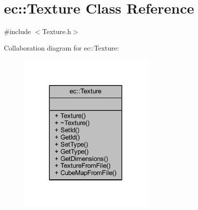 \hypertarget{classec_1_1_texture}{}\section{ec\+:\+:Texture Class Reference}
\label{classec_1_1_texture}


{\ttfamily \#include $<$Texture.\+h$>$}



Collaboration diagram for ec\+:\+:Texture\+:\nopagebreak
\begin{figure}[H]
\begin{center}
\leavevmode
\includegraphics[width=191pt]{classec_1_1_texture__coll__graph}
\end{center}
\end{figure}
